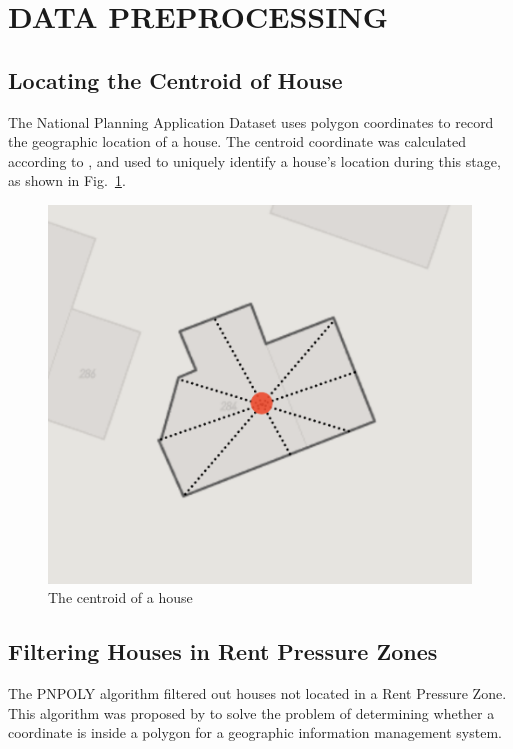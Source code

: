 \documentclass[conference, compsoc]{IEEEtran}
\begin{document}
\section{DATA PREPROCESSING}
\subsection{Locating the Centroid of House}
The National Planning Application Dataset uses polygon coordinates to record the geographic location of a house.
The centroid coordinate was calculated according to \cite{centroid-calculation}, and used to uniquely identify a house's location during this stage, as shown in Fig.~\ref{fig:house-centroid}.

\begin{figure}[htbp]
    \centerline{\includegraphics[width=0.5\linewidth]{figures/house-centroid.png}}
    \caption{The centroid of a house}
    \label{fig:house-centroid}
\end{figure}

\subsection{Filtering Houses in Rent Pressure Zones}
The PNPOLY algorithm filtered out houses not located in a Rent Pressure Zone.
This algorithm was proposed by \cite{pnpoly-algorithm} to solve the problem of determining whether a coordinate is inside a polygon for a geographic information management system.
\end{document}
